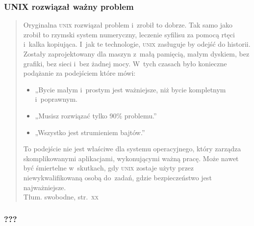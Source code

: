 \documentclass[10pt,t]{beamer}
\begin{document}
\begin{frame}
  \frametitle{UNIX rozwiązał ważny problem}


  \begin{quote}

    Oryginalna \textsc{unix} rozwiązał problem i~zrobił to dobrze. Tak samo
    jako zrobił to rzymski system numeryczny, leczenie syfilisu za pomocą
    rtęci i~kalka kopiująca. I~jak te technologie, \textsc{unix} zasługuje
    by odejść do historii. Zostały zaprojektowany dla maszyn z~małą
    pamięcią, małym dyskiem, bez grafiki, bez sieci i~bez żadnej mocy.
    W~tych czasach było konieczne podążanie za podejściem które mówi:

    \vspace{-0.3em}



    \begin{itemize}

    \item „Bycie małym i~prostym jest ważniejsze, niż bycie kompletnym
      i~poprawnym.

    \item „Musisz rozwiązać tylko 90\% problemu.”

    \item „Wszystko jest strumieniem bajtów.”

    \end{itemize}
    To podejście nie jest właściwe dla systemu operacyjnego, który zarządza
    skomplikowanymi aplikacjami, wykonującymi ważną pracę. Może nawet być
    śmiertelne w~skutkach, gdy \textsc{unix} zostaje użyty przez
    niewykwalifikowaną osobą do~zadań, gdzie bezpieczeństwo jest
    najważniejsze.  \\
    Tłum. swobodne, str.~\textsc{xx}
    \parencite{Garfinkel-Weise-Strassmann-The-UNIX-HATERS-Handbook-Pub-1994}

  \end{quote}

\end{frame}





\begin{frame}
  \frametitle{???}


\end{frame}
\end{document}
